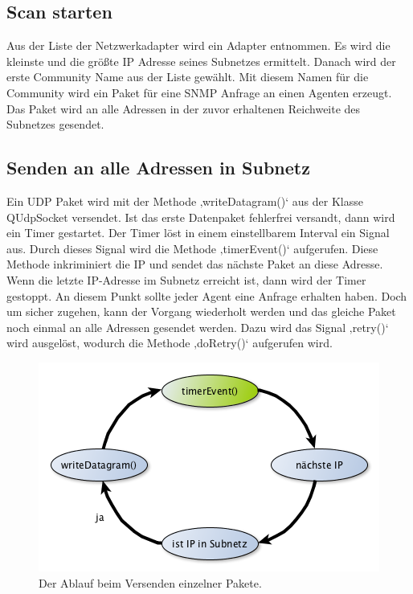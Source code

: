 \documentclass[11pt,a4paper]{article}
\begin{document}
\subsection{Scan starten}
Aus der Liste der Netzwerkadapter wird ein Adapter entnommen. Es wird die kleinste und die größte IP Adresse seines Subnetzes ermittelt. Danach wird der erste Community Name aus der Liste gewählt. Mit diesem Namen für die Community wird ein Paket für eine SNMP Anfrage an einen Agenten erzeugt. Das Paket wird an alle Adressen in der zuvor erhaltenen Reichweite des Subnetzes gesendet.\\

\subsection{Senden an alle Adressen in Subnetz}
Ein UDP Paket wird mit der Methode ‚writeDatagram()‘ aus der Klasse QUdpSocket versendet. Ist das erste Datenpaket fehlerfrei versandt, dann wird ein Timer gestartet. Der Timer löst in einem einstellbarem Interval ein Signal aus. Durch dieses Signal wird die Methode ‚timerEvent()‘ aufgerufen. Diese Methode inkriminiert die IP und sendet das nächste Paket an diese Adresse. Wenn die letzte IP-Adresse im Subnetz erreicht ist, dann wird der Timer gestoppt. An diesem Punkt sollte jeder Agent eine Anfrage erhalten haben. Doch um sicher zugehen, kann der Vorgang wiederholt werden und das gleiche Paket noch einmal an alle Adressen gesendet werden. Dazu wird das Signal ‚retry()‘ wird ausgelöst, wodurch die Methode ‚doRetry()‘ aufgerufen wird.\\
\begin{figure}[h]
	\centering
	\includegraphics[scale=.6]{Bilder/InnererKreis.png}
	\caption{Der Ablauf beim Versenden einzelner Pakete.}
\end{figure}
\end{document}
